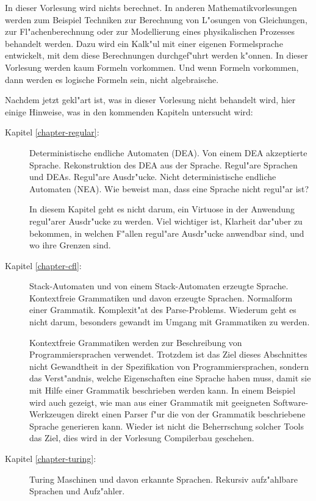 In dieser Vorlesung wird nichts berechnet.
In anderen
Mathematikvorlesungen werden zum Beispiel Techniken zur Berechnung
von L"osungen von
Gleichungen, zur Fl"achenberechnung oder zur Modellierung eines 
physikalischen Prozesses behandelt werden.
Dazu wird ein Kalk"ul mit einer eigenen Formelsprache entwickelt,
mit dem diese Berechnungen durchgef"uhrt werden k"onnen.
In dieser Vorlesung werden kaum Formeln vorkommen. 
Und wenn Formeln vorkommen, dann werden es logische Formeln sein,
nicht algebraische.

Nachdem jetzt gekl"art ist, was in dieser Vorlesung nicht behandelt
wird, hier einige Hinweise, was in den kommenden Kapiteln untersucht
wird:
\begin{description}
\item[Kapitel \ref{chapter-regular}:] Deterministische endliche Automaten (DEA). Von einem
DEA akzeptierte Sprache. Rekonstruktion des DEA aus der Sprache.
Regul"are Sprachen und DEAs. Regul"are Ausdr"ucke. Nicht deterministische
endliche Automaten (NEA). Wie beweist man, dass eine Sprache nicht regul"ar
ist?

In diesem Kapitel geht es nicht darum, ein Virtuose in der
Anwendung regul"arer Ausdr"ucke zu werden. Viel wichtiger ist, Klarheit dar"uber
zu bekommen, in welchen F"allen regul"are Ausdr"ucke anwendbar sind,
und wo ihre Grenzen sind.

\item[Kapitel \ref{chapter-cfl}:] Stack-Automaten und von einem Stack-Automaten
erzeugte Sprache. Kontextfreie Grammatiken und davon erzeugte Sprachen. 
Normalform einer Grammatik. Komplexit"at des Parse-Problems.
Wiederum geht es nicht darum, besonders gewandt im Umgang mit Grammatiken
zu werden.

Kontextfreie Grammatiken werden zur Beschreibung von Programmiersprachen verwendet.
Trotzdem ist das Ziel dieses Abschnittes nicht Gewandtheit in der Spezifikation
von Programmiersprachen, sondern das Verst"andnis, welche Eigenschaften eine
Sprache haben muss, damit sie mit Hilfe einer Grammatik beschrieben werden kann.
In einem Beispiel wird auch gezeigt, wie man aus einer Grammatik mit geeigneten
Software-Werkzeugen direkt einen Parser f"ur die von der Grammatik beschriebene
Sprache generieren kann. Wieder ist nicht die Beherrschung solcher Tools das
Ziel, dies wird in der Vorlesung Compilerbau geschehen.

\item[Kapitel \ref{chapter-turing}:] Turing Maschinen und davon erkannte Sprachen. 
Rekursiv aufz"ahlbare Sprachen und Aufz"ahler.


\end{description}
